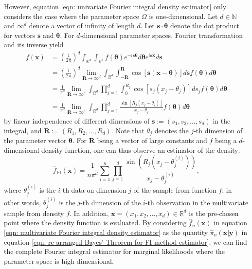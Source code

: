 \documentclass[%
 reprint,
 amsmath,amssymb,
 aps,
]{revtex4-2}
\def\N{\mathbb{N}}
\def\R{\mathbb{R}}
\def\btheta{\boldsymbol{\theta}}
\def\ybold{\mathbf{y}}
\def\xbold{\mathbf{x}}
\def\sbold{\mathbf{s}}
\def\Rbold{\mathbf{R}}
\begin{document}
However, equation \eqref{eqn: univariate Fourier integral density estimator} only considers the case where the parameter space $\Omega$ is one-dimensional. Let  $d \in \N$ and $\infty^d$ denote a vector of infinity of length $d$. Let $\mathbf{s} \cdot \btheta$ denote the dot product for vectors $\mathbf{s}$ and $\btheta$. For $d$-dimensional parameter spaces, Fourier transformation and its inverse yield
\begin{align} \label{eqn: multivariate Fourier integral}
    f(\xbold) & = \left(\frac{1}{2\pi}\right)^d\int_{\R^d} \int_{\R^d}f(\btheta) e^{-i\sbold\btheta}d\btheta e^{i\sbold\xbold}d\sbold \\
    & = \left(\frac{1}{2\pi}\right)^d \lim_{\Rbold \to \infty^d} \int_{\R^d} \int_{-\Rbold}^\Rbold \cos[\sbold(\xbold-\btheta)]d\sbold f(\btheta)d\btheta \\
    & = \frac{1}{\pi^d} \lim_{\Rbold \to \infty^d} \int_{\R^d} \prod_{j=1}^d \int_0^{R_j} \cos[s_j(x_j-\theta_j)]ds_j f(\btheta)d\btheta \\
    & = \frac{1}{\pi^d} \lim_{\Rbold \to \infty^d} \int_{\R^d} \prod_{j=1}^d \frac{\sin[R_j(x_j-\theta_j)]}{x_j-\theta_j} f(\btheta)d\btheta
\end{align}
by linear independence of different dimensions of $\sbold := (s_1, s_2, \ldots, s_d)$ in the integral, and $\Rbold := (R_1, R_2, \ldots, R_d)$. Note that $\theta_j$ denotes the $j$-th dimension of the parameter vector $\btheta$. For $\Rbold$ being a vector of large constants and $f$ being a $d$-dimensional density function, one can thus observe an estimator of the density:
\begin{equation} \label{eqn: multivariate Fourier integral density estimator}
    \hat{f}_\text{FI}(\mathbf{x}) = \frac{1}{n\pi^d}\sum_{i = 1}^n \prod_{j = 1}^d \frac{\sin(R_j(x_j - \theta_j^{(i)}))}{x_j - \theta_j^{(i)}},
\end{equation}
where $\theta_j^{(i)}$ is the $i$-th data on dimension $j$ of the sample from function $f$; in other words, $\theta_j^{(i)}$ is the $j$-th dimension of the $i$-th observation in the multivariate sample from density $f$. In addition, $\mathbf{x} = (x_1, x_2, \ldots, x_d) \in \R^d$ is the pre-chosen point where the density function is evaluated. By considering $\hat{f}_n(\mathbf{x})$ in equation \eqref{eqn: multivariate Fourier integral density estimator} as the quantity $\hat{\pi}_n (\xbold | \ybold)$ in equation \eqref{eqn: re-arranged Bayes' Theorem for FI method estimator}, we can find the complete Fourier integral estimator for marginal likelihoods where the parameter space is high dimensional.
\end{document}
